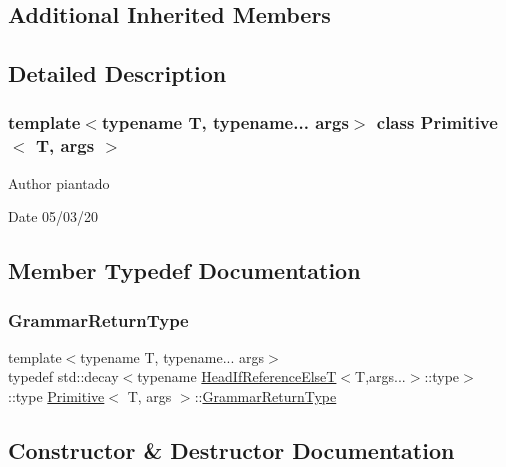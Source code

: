 \subsection*{Additional Inherited Members}


\subsection{Detailed Description}
\subsubsection*{template$<$typename T, typename... args$>$\newline
class Primitive$<$ T, args $>$}

\begin{DoxyAuthor}{Author}
piantado 
\end{DoxyAuthor}
\begin{DoxyDate}{Date}
05/03/20 
\end{DoxyDate}


\subsection{Member Typedef Documentation}
\mbox{\label{struct_primitive_a1f2d2db3fb7869d03d65112e30d22101}} 
\subsubsection{\texorpdfstring{Grammar\+Return\+Type}{GrammarReturnType}}
{\footnotesize\ttfamily template$<$typename T, typename... args$>$ \\
typedef std\+::decay$<$typename \hyperlink{struct_head_if_reference_else_t}{Head\+If\+Reference\+ElseT}$<$T,args...$>$\+::type$>$\+::type \hyperlink{struct_primitive}{Primitive}$<$ T, args $>$\+::\hyperlink{struct_primitive_a1f2d2db3fb7869d03d65112e30d22101}{Grammar\+Return\+Type}}



\subsection{Constructor \& Destructor Documentation}
\mbox{\label{struct_primitive_a582a781e02c86b17df208d6fc0c39daf}} 
